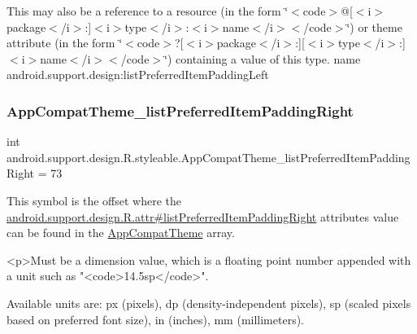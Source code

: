 This may also be a reference to a resource (in the form \char`\"{}$<$code$>$@\mbox{[}$<$i$>$package$<$/i$>$\+:\mbox{]}$<$i$>$type$<$/i$>$\+:$<$i$>$name$<$/i$>$$<$/code$>$\char`\"{}) or theme attribute (in the form \char`\"{}$<$code$>$?\mbox{[}$<$i$>$package$<$/i$>$\+:\mbox{]}\mbox{[}$<$i$>$type$<$/i$>$\+:\mbox{]}$<$i$>$name$<$/i$>$$<$/code$>$\char`\"{}) containing a value of this type.  name android.\+support.\+design\+:list\+Preferred\+Item\+Padding\+Left \mbox{\label{classandroid_1_1support_1_1design_1_1R_1_1styleable_a88a4a9392e587ed500ccdae581df5835}} 
\subsubsection{\texorpdfstring{App\+Compat\+Theme\+\_\+list\+Preferred\+Item\+Padding\+Right}{AppCompatTheme\_listPreferredItemPaddingRight}}
{\footnotesize\ttfamily int android.\+support.\+design.\+R.\+styleable.\+App\+Compat\+Theme\+\_\+list\+Preferred\+Item\+Padding\+Right = 73\hspace{0.3cm}{\ttfamily [static]}}

This symbol is the offset where the \hyperlink{classandroid_1_1support_1_1design_1_1R_1_1attr_a35b15db2513263f58557a28063e21a25}{android.\+support.\+design.\+R.\+attr\#list\+Preferred\+Item\+Padding\+Right} attribute\textquotesingle{}s value can be found in the \hyperlink{classandroid_1_1support_1_1design_1_1R_1_1styleable_afb351dc8de20cbd4c89abe360373010c}{App\+Compat\+Theme} array.

\begin{DoxyVerb}      <p>Must be a dimension value, which is a floating point number appended with a unit such as "<code>14.5sp</code>".
\end{DoxyVerb}
 Available units are\+: px (pixels), dp (density-\/independent pixels), sp (scaled pixels based on preferred font size), in (inches), mm (millimeters). 


